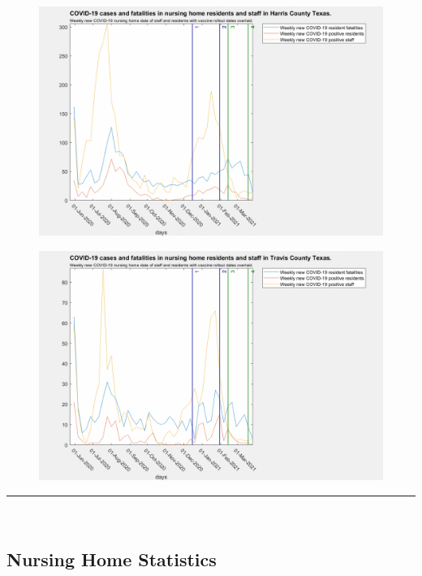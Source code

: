 \documentclass[twoside]{article}
\begin{document}
\begin{multicols}{2}
\begin{figure}[H]
	\includegraphics[width=\linewidth]{images/harris_nursing_home_with_vaccine.png}
	\caption{}
	\label{fig:images/harris_nursing_home_with_vaccineLabel}
\end{figure}

\begin{figure}[H]
	\includegraphics[width=\linewidth]{images/travis_nursing_home_with_vaccine.png}
	\caption{}
	\label{fig:images/travis_nursing_home_with_vaccineLabel}
\end{figure}
\rule{\linewidth}{0.5pt}\\
\subsection{Nursing Home Statistics}




\end{multicols}
\end{document}
